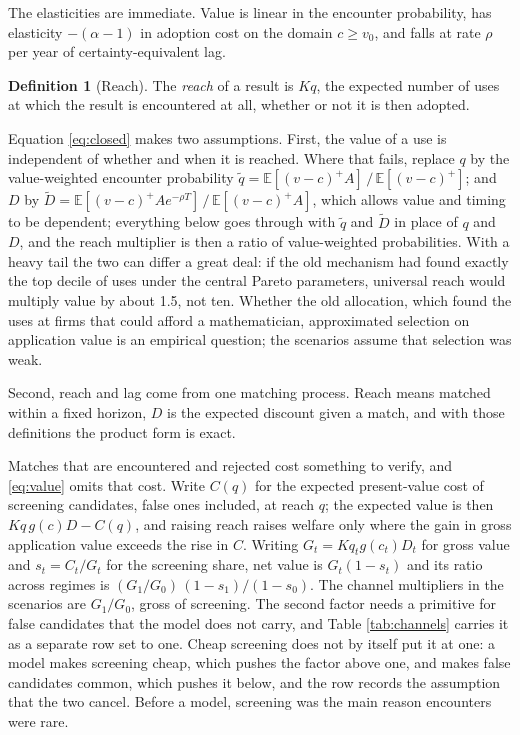 \documentclass[11pt]{article}
\theoremstyle{definition}
\newtheorem{definition}{Definition}
\theoremstyle{remark}
\newcommand{\E}{\mathbb{E}}
\begin{document}
The elasticities are immediate. Value is linear in the encounter probability, has elasticity $-(\alpha - 1)$ in adoption cost on the domain $c \ge v_0$, and falls at rate $\rho$ per year of certainty-equivalent lag.

\begin{definition}[Reach]
The \emph{reach} of a result is $Kq$, the expected number of uses at which the result is encountered at all, whether or not it is then adopted.
\end{definition}

Equation \eqref{eq:closed} makes two assumptions. First, the value of a use is independent of whether and when it is reached. Where that fails, replace $q$ by the value-weighted encounter probability $\tilde q = \E[(v-c)^+ A]\,/\,\E[(v-c)^+]$; and $D$ by $\tilde D = \E[(v-c)^+ A e^{-\rho T}]\,/\,\E[(v-c)^+ A]$, which allows value and timing to be dependent; everything below goes through with $\tilde q$ and $\tilde D$ in place of $q$ and $D$, and the reach multiplier is then a ratio of value-weighted probabilities. With a heavy tail the two can differ a great deal: if the old mechanism had found exactly the top decile of uses under the central Pareto parameters, universal reach would multiply value by about 1.5, not ten. Whether the old allocation, which found the uses at firms that could afford a mathematician, approximated selection on application value is an empirical question; the scenarios assume that selection was weak.

Second, reach and lag come from one matching process. Reach means matched within a fixed horizon, $D$ is the expected discount given a match, and with those definitions the product form is exact.

Matches that are encountered and rejected cost something to verify, and \eqref{eq:value} omits that cost. Write $C(q)$ for the expected present-value cost of screening candidates, false ones included, at reach $q$; the expected value is then $K q\, g(c) D - C(q)$, and raising reach raises welfare only where the gain in gross application value exceeds the rise in $C$. Writing $G_t = K q_t g(c_t) D_t$ for gross value and $s_t = C_t / G_t$ for the screening share, net value is $G_t (1 - s_t)$ and its ratio across regimes is $(G_1/G_0)\,(1-s_1)/(1-s_0)$. The channel multipliers in the scenarios are $G_1/G_0$, gross of screening. The second factor needs a primitive for false candidates that the model does not carry, and Table \ref{tab:channels} carries it as a separate row set to one. Cheap screening does not by itself put it at one: a model makes screening cheap, which pushes the factor above one, and makes false candidates common, which pushes it below, and the row records the assumption that the two cancel. Before a model, screening was the main reason encounters were rare.
\end{document}
